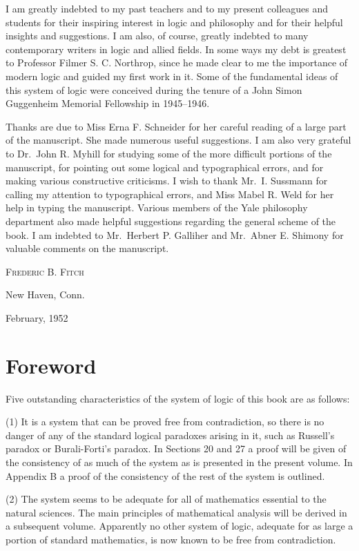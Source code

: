 \documentclass{book}
\begin{document}
I am greatly indebted to my past teachers and to my present colleagues and students for their inspiring interest in logic and philosophy and for their helpful insights and suggestions.  I am also, of course, greatly indebted to many contemporary writers in logic and allied fields.  In some ways my debt is greatest to Professor Filmer S. C. Northrop, since he made clear to me the importance of modern logic and guided my first work in it.  Some of the fundamental ideas of this system of logic were conceived during the tenure of a John Simon Guggenheim Memorial Fellowship in 1945–1946.

Thanks are due to Miss Erna F. Schneider for her careful reading of a large part of the manuscript.  She made numerous useful suggestions.  I am also very grateful to Dr.\ John R. Myhill for studying some of the more difficult portions of the manuscript, for pointing out some logical and typographical errors, and for making various constructive criticisms.  I wish to thank Mr.\ I. Sussmann for calling my attention to typographical errors, and Miss Mabel R. Weld for her help in typing the manuscript.  Various members of the Yale philosophy department also made helpful suggestions regarding the general scheme of the book.  I am indebted to Mr.\ Herbert P. Galliher and Mr.\ Abner E. Shimony for valuable comments on the manuscript.

\vspace{1em}
\hfill\textsc{Frederic B. Fitch}

\noindent New Haven, Conn.

February, 1952

\chapter*{Foreword}

Five outstanding characteristics of the system of logic of this book are as follows:

(1) It is a system that can be proved free from contradiction, so there is no danger of any of the standard logical paradoxes arising in it, such as Russell's paradox or Burali-Forti's paradox.  In Sections 20 and 27 a proof will be given of the consistency of as much of the system as is presented in the present volume.  In Appendix B a proof of the consistency of the rest of the system is outlined.

(2) The system seems to be adequate for all of mathematics essential to the natural sciences.  The main principles of mathematical analysis will be derived in a subsequent volume.  Apparently no other system of logic, adequate for as large a portion of standard mathematics, is now known to be free from contradiction.
\end{document}
